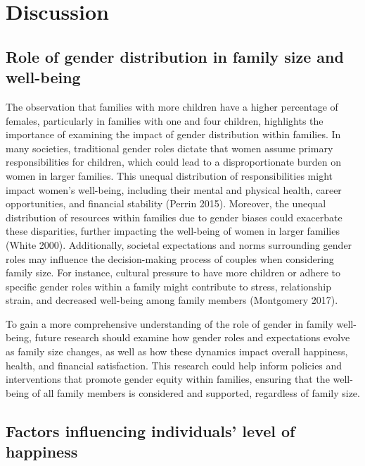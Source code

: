 \documentclass[
  letterpaper,
  DIV=11,
  numbers=noendperiod]{scrartcl}
\begin{document}
\hypertarget{discussion}{%
\section{Discussion}\label{discussion}}

\hypertarget{role-of-gender-distribution-in-family-size-and-well-being}{%
\subsection{Role of gender distribution in family size and
well-being}\label{role-of-gender-distribution-in-family-size-and-well-being}}

The observation that families with more children have a higher
percentage of females, particularly in families with one and four
children, highlights the importance of examining the impact of gender
distribution within families. In many societies, traditional gender
roles dictate that women assume primary responsibilities for children,
which could lead to a disproportionate burden on women in larger
families. This unequal distribution of responsibilities might impact
women's well-being, including their mental and physical health, career
opportunities, and financial stability (Perrin 2015). Moreover, the
unequal distribution of resources within families due to gender biases
could exacerbate these disparities, further impacting the well-being of
women in larger families (White 2000). Additionally, societal
expectations and norms surrounding gender roles may influence the
decision-making process of couples when considering family size. For
instance, cultural pressure to have more children or adhere to specific
gender roles within a family might contribute to stress, relationship
strain, and decreased well-being among family members (Montgomery 2017).

To gain a more comprehensive understanding of the role of gender in
family well-being, future research should examine how gender roles and
expectations evolve as family size changes, as well as how these
dynamics impact overall happiness, health, and financial satisfaction.
This research could help inform policies and interventions that promote
gender equity within families, ensuring that the well-being of all
family members is considered and supported, regardless of family size.

\hypertarget{factors-influencing-individuals-level-of-happiness}{%
\subsection{Factors influencing individuals' level of
happiness}\label{factors-influencing-individuals-level-of-happiness}}
\end{document}
